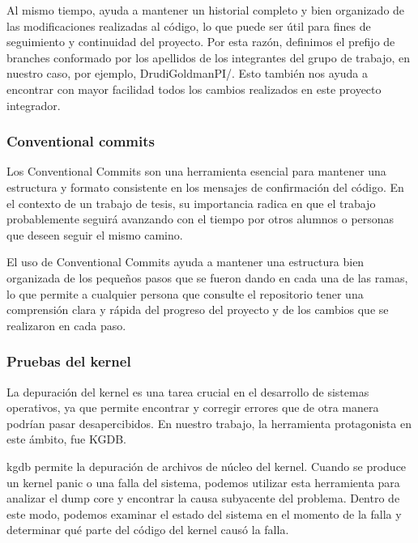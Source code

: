 Al mismo tiempo, ayuda a mantener un historial completo y bien organizado de las modificaciones realizadas al código, lo que puede ser útil para fines de seguimiento y continuidad del proyecto. Por esta razón, definimos el prefijo de branches conformado por los apellidos de los integrantes del grupo de trabajo, en nuestro caso, por ejemplo, DrudiGoldmanPI/. Esto también nos ayuda a encontrar con mayor facilidad todos los cambios realizados en este proyecto integrador.\par


\subsubsection{Conventional commits}
Los Conventional Commits son una herramienta esencial para mantener una estructura y formato consistente en los mensajes de confirmación del código. En el contexto de un trabajo de tesis, su importancia radica en que el trabajo probablemente seguirá avanzando con el tiempo por otros alumnos o personas que deseen seguir el mismo camino.\par

El uso de Conventional Commits ayuda a mantener una estructura bien organizada de los pequeños pasos que se fueron dando en cada una de las ramas, lo que permite a cualquier persona que consulte el repositorio tener una comprensión clara y rápida del progreso del proyecto y de los cambios que se realizaron en cada paso.\par

\subsubsection{Pruebas del kernel}
La depuración del kernel es una tarea crucial en el desarrollo de sistemas operativos, ya que permite encontrar y corregir errores que de otra manera podrían pasar desapercibidos. En nuestro trabajo, la herramienta protagonista en este ámbito, fue KGDB.\par

kgdb permite la depuración de archivos de núcleo del kernel. Cuando se produce un kernel panic o una falla del sistema, podemos utilizar esta herramienta para analizar el dump core y encontrar la causa subyacente del problema. Dentro de  este modo, podemos examinar el estado del sistema en el momento de la falla y determinar qué parte del código del kernel causó la falla.\par





